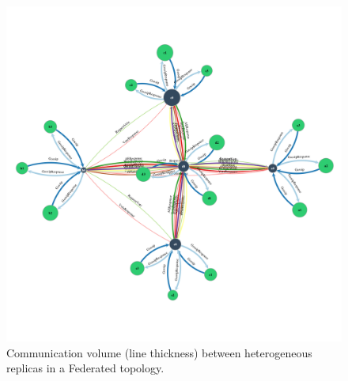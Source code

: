 \documentclass[10pt,conference,letterpaper]{IEEEtran}
\begin{document}
%

\begin{figure}
    \centering
      \includegraphics[width=\linewidth]{figures/federated_sync}
    \caption{Communication volume (line thickness) between  heterogeneous replicas in a Federated topology.}
    \label{fig:topology}
\end{figure}
\end{document}
